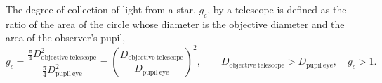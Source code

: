 The degree of collection of light from a star, $g_c$, by a telescope is
defined as the ratio of the area of the circle whose diameter is the
objective diameter and the area of the observer's pupil,
\[
g_c=\frac{\frac\pi4D_{\mathrm{objective\ telescope}}^2}
{\frac\pi4D_{\mathrm{pupil\ eye}}^2}
=\left(\frac{D_{\mathrm{objective\ telescope}}}{D_{\mathrm{pupil\ eye}}}\right)^2,
\qquad D_{\mathrm{objective\ telescope}}>D_{\mathrm{pupil\ eye}},\quad g_c>1.
\]
